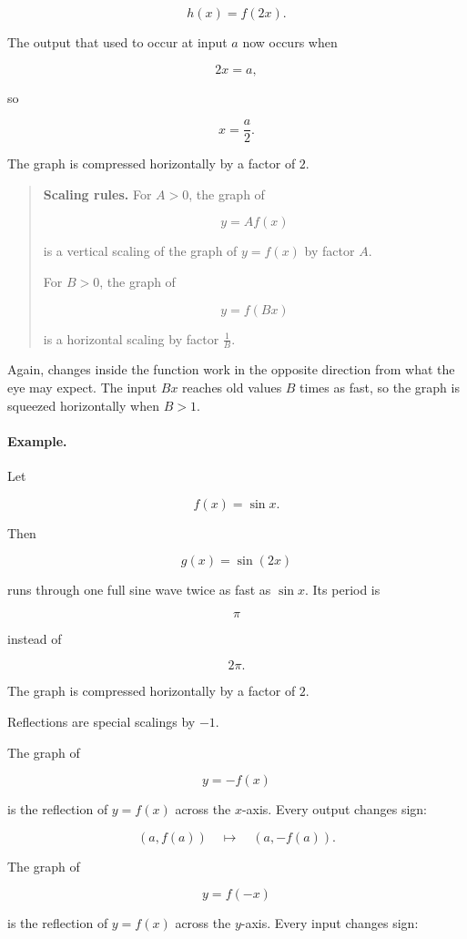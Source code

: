 \[
h(x)=f(2x).
\]

The output that used to occur at input \(a\) now occurs when

\[
2x=a,
\]

so

\[
x=\frac a2.
\]

The graph is compressed horizontally by a factor of \(2\).

\begin{quote}
\textbf{Scaling rules.}
For \(A>0\), the graph of

\[
y=Af(x)
\]

is a vertical scaling of the graph of \(y=f(x)\) by factor \(A\).

For \(B>0\), the graph of

\[
y=f(Bx)
\]

is a horizontal scaling by factor \(\frac1B\).
\end{quote}

Again, changes inside the function work in the opposite direction from what the eye may expect. The input \(Bx\) reaches old values \(B\) times as fast, so the graph is squeezed horizontally when \(B>1\).

\paragraph{Example.}
Let

\[
f(x)=\sin x.
\]

Then

\[
g(x)=\sin(2x)
\]

runs through one full sine wave twice as fast as \(\sin x\). Its period is

\[
\pi
\]

instead of

\[
2\pi.
\]

The graph is compressed horizontally by a factor of \(2\).

Reflections are special scalings by \(-1\).

The graph of

\[
y=-f(x)
\]

is the reflection of \(y=f(x)\) across the \(x\)-axis. Every output changes sign:

\[
(a,f(a))
\quad\longmapsto\quad
(a,-f(a)).
\]

The graph of

\[
y=f(-x)
\]

is the reflection of \(y=f(x)\) across the \(y\)-axis. Every input changes sign:

